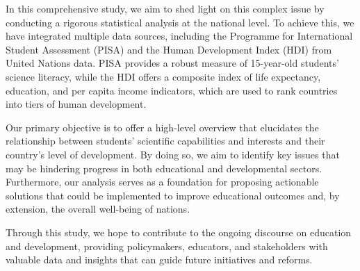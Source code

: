 \documentclass[12pt]{article}
\begin{document}
In this comprehensive study, we aim to shed light on this complex issue by conducting a rigorous statistical analysis at the national level. To achieve this, we have integrated multiple data sources, including the Programme for International Student Assessment (PISA) \cite{oecd_pisa_2016} and the Human Development Index (HDI) \cite{undp_hdi_2021} from United Nations data. PISA provides a robust measure of 15-year-old students' science literacy, while the HDI offers a composite index of life expectancy, education, and per capita income indicators, which are used to rank countries into tiers of human development.

Our primary objective is to offer a high-level overview that elucidates the relationship between students' scientific capabilities and interests and their country's level of development. By doing so, we aim to identify key issues that may be hindering progress in both educational and developmental sectors. Furthermore, our analysis serves as a foundation for proposing actionable solutions that could be implemented to improve educational outcomes and, by extension, the overall well-being of nations.

Through this study, we hope to contribute to the ongoing discourse on education and development, providing policymakers, educators, and stakeholders with valuable data and insights that can guide future initiatives and reforms.




\end{document}
